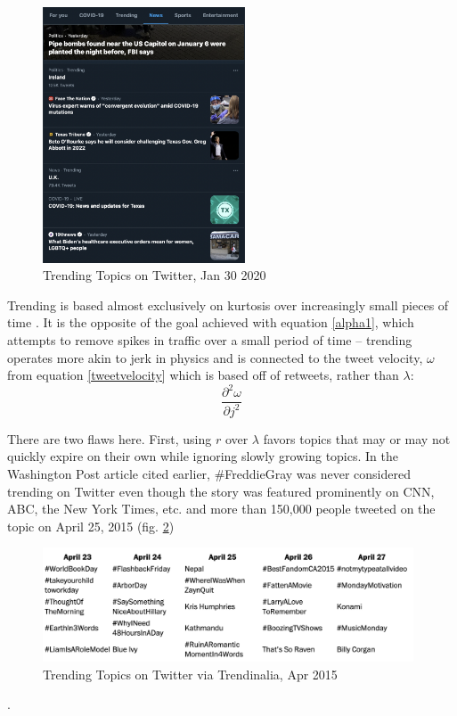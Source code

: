 \documentclass[NETN,manuscript]{stjour-new}
\begin{document}
\begin{figure}[htp]
    \centering
    \includegraphics[width=6cm]{Twitter Trending.png}
    \caption{Trending Topics on Twitter, Jan 30 2020}
    \label{img:Trending Topics}
\end{figure}


Trending is based almost exclusively on kurtosis over increasingly small pieces of time \citep{dewey2015freddie,lotan2015freddie}. It is the opposite of the goal achieved with equation \ref{alpha1}, which attempts to remove spikes in traffic over a small period of time -- trending operates more akin to jerk in physics and is connected to the tweet velocity, $\omega$ from equation \ref{tweetvelocity} which is based off of retweets, rather than $\lambda$: 
\[
    \frac{\partial^2 \omega}{\partial j^2}
\]

There are two flaws here. First, using $r$ over $\lambda$ favors topics that may or may not quickly expire on their own while ignoring slowly growing topics. In the Washington Post article cited earlier, \#FreddieGray was never considered trending on Twitter even though the story was featured prominently on CNN, ABC, the New York Times, etc. and more than 150,000 people tweeted on the topic on April 25, 2015 (fig. \ref{img:Trendinalia 2015})
\begin{figure}[htp]
    \centering
    \includegraphics[width=11cm]{Trendinalia Apr, 2015.png}
    \caption{Trending Topics on Twitter via Trendinalia, Apr 2015}
    \label{img:Trendinalia 2015}
\end{figure}
. 
\end{document}

